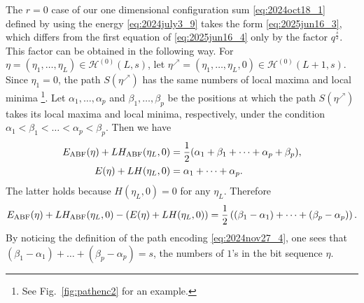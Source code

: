 \documentclass[sn-mathphys-num]{sn-jnl}%
\theoremstyle{thmstyleone}%
\theoremstyle{thmstyletwo}%
\theoremstyle{thmstylethree}%
\begin{document}
\begin{appendices}
The $r=0$ case of our one dimensional configuration sum \eqref{eq:2024oct18_1}
defined by using the energy \eqref{eq:2024july3_9} takes the form
\eqref{eq:2025jun16_3}, which differs from the first equation of \eqref{eq:2025jun16_4} only by 
the factor $q^{\frac{s}{2}}$.
This factor can be obtained in the following way.
For $\eta =(\eta_1, \dots, \eta_L) \in \mathcal{H}^{(0)} (L,s)$, let
$\eta^{\nearrow} =(\eta_1, \dots, \eta_L, 0) \in \mathcal{H}^{(0)} (L+1,s)$.
Since $\eta_1 =0$, the path $S(\eta^{\nearrow})$ has the same numbers of
local maxima and local minima \footnote{See Fig.~\ref{fig:pathenc2} for an example.}.
Let $\alpha_1, \dots, \alpha_p$ and $\beta_1, \dots, \beta_p$ be the positions
at which the path $S(\eta^{\nearrow})$ takes its local maxima and local minima, respectively,
under the condition $\alpha_1 < \beta_1 < \dots < \alpha_p < \beta_p$.
Then we have
\begin{align*}
E_{\rm ABF}(\eta) + L H_{\rm ABF}(\eta_L,0) &= \frac12 (\alpha_1 + \beta_1+\dots+\alpha_p + \beta_p),\\
E(\eta) + L H(\eta_L,0) &=\alpha_1 +\dots+\alpha_p.
\end{align*} 
The latter holds because $H(\eta_L,0) =0$ for any $\eta_L$.
Therefore
\begin{equation*}
E_{\rm ABF}(\eta) + L H_{\rm ABF}(\eta_L,0) - (E(\eta) + L H(\eta_L,0))=
\frac12 \left( (\beta_1 - \alpha_1) + \dots + (\beta_p - \alpha_p) \right).
\end{equation*}
By noticing the definition of the path encoding \eqref{eq:2024nov27_4},
one sees that $ (\beta_1 - \alpha_1) + \dots + (\beta_p - \alpha_p)=s$, the numbers of
$1$'s in the bit sequence $\eta$. 
\end{appendices}
\end{document}

